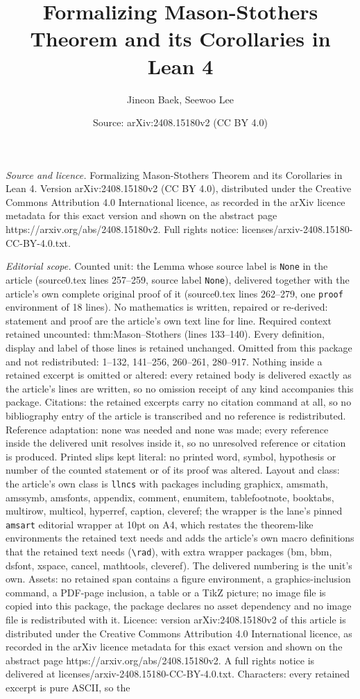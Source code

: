 \documentclass[10pt,a4paper]{amsart}
\title[Formalizing Mason-Stothers Theorem and its Corollaries in Le]{Formalizing Mason-Stothers Theorem and its Corollaries in Lean 4}
\author{Jineon Baek, Seewoo Lee}
\date{Source: arXiv:2408.15180v2 (CC BY 4.0)}
\begin{document}
\maketitle

\noindent\emph{Source and licence.} Formalizing Mason-Stothers Theorem and its Corollaries in Lean 4. Version arXiv:2408.15180v2 (CC BY 4.0), distributed under the Creative Commons Attribution 4.0 International licence, as recorded in the arXiv licence metadata for this exact version and shown on the abstract page https://arxiv.org/abs/2408.15180v2. Full rights notice: licenses/arxiv-2408.15180-CC-BY-4.0.txt.\par\smallskip

\noindent\textit{Editorial scope.} Counted unit: the Lemma whose source label is \texttt{None} in the article (source0.tex lines 257--259, source label \texttt{None}), delivered together with the article's own complete original proof of it (source0.tex lines 262--279, one \texttt{proof} environment of 18 lines). No mathematics is written, repaired or re-derived: statement and proof are the article's own text line for line. Required context retained uncounted: thm:Mason--Stothers (lines 133--140). Every definition, display and label of those lines is retained unchanged. Omitted from this package and not redistributed: 1--132, 141--256, 260--261, 280--917. Nothing inside a retained excerpt is omitted or altered: every retained body is delivered exactly as the article's lines are written, so no omission receipt of any kind accompanies this package. Citations: the retained excerpts carry no citation command at all, so no bibliography entry of the article is transcribed and no reference is redistributed. Reference adaptation: none was needed and none was made; every reference inside the delivered unit resolves inside it, so no unresolved reference or citation is produced. Printed slips kept literal: no printed word, symbol, hypothesis or number of the counted statement or of its proof was altered. Layout and class: the article's own class is \texttt{llncs} with packages including graphicx, amsmath, amssymb, amsfonts, appendix, comment, enumitem, tablefootnote, booktabs, multirow, multicol, hyperref, caption, cleveref; the wrapper is the lane's pinned \texttt{amsart} editorial wrapper at 10pt on A4, which restates the theorem-like environments the retained text needs and adds the article's own macro definitions that the retained text needs (\texttt{\textbackslash rad}), with extra wrapper packages (bm, bbm, dsfont, xspace, cancel, mathtools, cleveref). The delivered numbering is the unit's own. Assets: no retained span contains a figure environment, a graphics-inclusion command, a PDF-page inclusion, a table or a TikZ picture; no image file is copied into this package, the package declares no asset dependency and no image file is redistributed with it. Licence: version arXiv:2408.15180v2 of this article is distributed under the Creative Commons Attribution 4.0 International licence, as recorded in the arXiv licence metadata for this exact version and shown on the abstract page https://arxiv.org/abs/2408.15180v2. A full rights notice is delivered at licenses/arxiv-2408.15180-CC-BY-4.0.txt. Characters: every retained excerpt is pure ASCII, so the 
\end{document}
